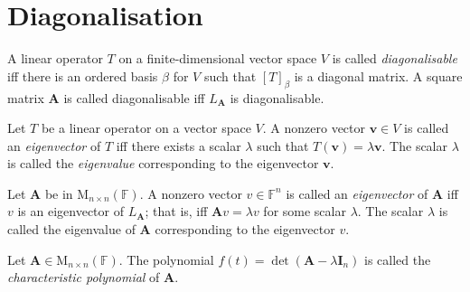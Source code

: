 \section{Diagonalisation}
\begin{definition}{}{}
    A linear operator \(T\) on a finite-dimensional vector space \(V\) is called \emph{diagonalisable} iff there is an ordered basis \(\beta\) for \(V\) such that \([T]_\beta\) is a diagonal matrix. A square matrix \(\mathbf{A}\) is called diagonalisable iff \(L_\mathbf{A}\) is diagonalisable.
\end{definition}
\begin{definition}{}{}
    Let \(T\) be a linear operator on a vector space \(V\). A nonzero vector \(\mathbf{v}\in V\) is called an \emph{eigenvector} of \(T\) iff there exists a scalar \(\lambda\) such that \(T(\mathbf{v})=\lambda \mathbf{v}\). The scalar \(\lambda\) is called the \emph{eigenvalue} corresponding to the eigenvector \(\mathbf{v}\).

    Let \(\mathbf{A}\) be in \(\mathrm{M}_{n\times n}(\mathbb{F})\). A nonzero vector \(v\in \mathbb{F}^n\) is called an \emph{eigenvector} of \(\mathbf{A}\) iff \(v\) is an eigenvector of \(L_\mathbf{A}\); that is, iff \(\mathbf{A}v=\lambda v\) for some scalar \(\lambda\). The scalar \(\lambda\) is called the eigenvalue of \(\mathbf{A}\) corresponding to the eigenvector \(v\).
\end{definition}
\begin{definition}{}{}
    Let \(\mathbf{A}\in \mathrm{M}_{n\times n}(\mathbb{F})\). The polynomial \(f(t)=\det(\mathbf{A}-\lambda \mathbf{I}_n)\) is called the \emph{characteristic polynomial} of \(\mathbf{A}\).
\end{definition}
